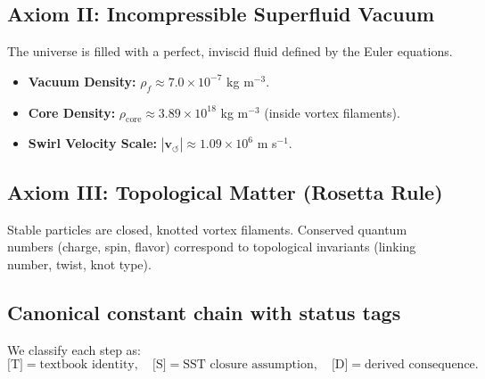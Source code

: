 \documentclass[10pt]{article}
\newcommand{\vswirl}{\mathbf{v}_{\!\boldsymbol{\circlearrowleft}}}
\newcommand{\rhof}{\rho_{\!f}}                           %
\newcommand{\rhocore}{\rho_{\text{core}}}
\begin{document}
        \subsection*{Axiom II: Incompressible Superfluid Vacuum}
            The universe is filled with a perfect, inviscid fluid defined by the Euler equations.
            \begin{itemize}
                \item \textbf{Vacuum Density:} $\rhof \approx 7.0 \times 10^{-7}$ kg m$^{-3}$.
                \item \textbf{Core Density:} $\rhocore \approx 3.89 \times 10^{18}$ kg m$^{-3}$ (inside vortex filaments).
                \item \textbf{Swirl Velocity Scale:} $|\vswirl| \approx 1.09 \times 10^6$ m s$^{-1}$.
            \end{itemize}

        \subsection*{Axiom III: Topological Matter (Rosetta Rule)}
            Stable particles are closed, knotted vortex filaments. Conserved quantum numbers (charge, spin, flavor) correspond to topological invariants (linking number, twist, knot type).

    \subsection{Canonical constant chain with status tags}
        \label{sec:canon-constants-status}

        We classify each step as:
        \[
            \text{[T]}=\text{textbook identity},\quad
            \text{[S]}=\text{SST closure assumption},\quad
            \text{[D]}=\text{derived consequence}.
        \]
\end{document}
